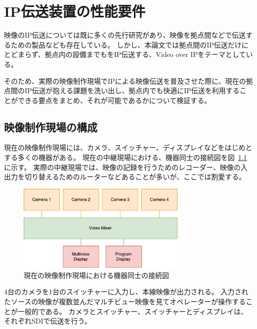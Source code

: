 \chapter{IP伝送装置の性能要件}
\label{chap:network-transmission}

映像のIP伝送については既に多くの先行研究があり、映像を拠点間などで伝送するための製品なども存在している。
しかし、本論文では拠点間のIP伝送だけにとどまらず、拠点内の設備までもをIP伝送する、Video over IPをテーマとしている。

そのため、実際の映像制作現場でIPによる映像伝送を普及させた際に、現在の拠点間のIP伝送が抱える課題を洗い出し、拠点内でも快適にIP伝送を利用することができる要点をまとめ、それが可能であるかについて検証する。

\section{映像制作現場の構成}

現在の映像制作現場には、カメラ、スイッチャー、ディスプレイなどをはじめとする多くの機器がある。
現在の中継現場における、機器同士の接続図を図~\ref{fig:broadcast-diagram-on-sdi}に示す。
実際の中継現場では、映像の記録を行うためのレコーダー、映像の入出力を切り替えるためのルーターなどあることが多いが、ここでは割愛する。

\begin{figure}[htbp]
  \begin{center}
    \includegraphics[bb=0 0 432 222,width=8.233cm]{img/broadcast-diagram-on-sdi.pdf}
  \end{center}
  \caption{現在の映像制作現場における機器同士の接続図}
  \label{fig:broadcast-diagram-on-sdi}
\end{figure}

4台のカメラを1台のスイッチャーに入力し、本線映像が出力される。
入力されたソースの映像が複数並んだマルチビュー映像を見てオペレーターが操作することが一般的である。
カメラとスイッチャー、スイッチャーとディスプレイは、それぞれSDIで伝送を行う。

